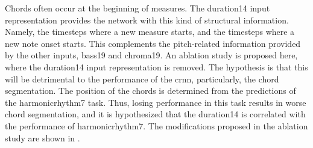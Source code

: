 
Chords often occur at the beginning of measures. The
\gls{duration14} input representation provides the network
with this kind of structural information. Namely, the
timesteps where a new measure starts, and the timesteps
where a new note onset starts. This complements the
pitch-related information provided by the other inputs,
\gls{bass19} and \gls{chroma19}. An ablation study is
proposed here, where the \gls{duration14} input
representation is removed. The hypothesis is that this will
be detrimental to the performance of the \gls{crnn},
particularly, the chord segmentation. The position of the
chords is determined from the predictions of the
\gls{harmonicrhythm7} task. Thus, losing performance in this
task results in worse chord segmentation, and it is
hypothesized that the \gls{duration14} is correlated with
the performance of \gls{harmonicrhythm7}. The modifications
proposed in the ablation study are shown in
.

